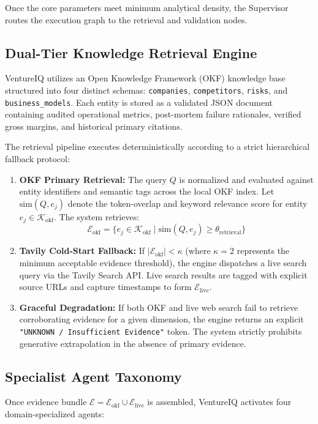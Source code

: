 \documentclass[conference]{IEEEtran}
\begin{document}
Once the core parameters meet minimum analytical density, the Supervisor routes the execution graph to the retrieval and validation nodes.

\subsection{Dual-Tier Knowledge Retrieval Engine}
VentureIQ utilizes an Open Knowledge Framework (OKF) knowledge base structured into four distinct schemas: \texttt{companies}, \texttt{competitors}, \texttt{risks}, and \texttt{business\_models}. Each entity is stored as a validated JSON document containing audited operational metrics, post-mortem failure rationales, verified gross margins, and historical primary citations.

The retrieval pipeline executes deterministically according to a strict hierarchical fallback protocol:
\begin{enumerate}
    \item \textbf{OKF Primary Retrieval:} The query $Q$ is normalized and evaluated against entity identifiers and semantic tags across the local OKF index. Let $\text{sim}(Q, e_j)$ denote the token-overlap and keyword relevance score for entity $e_j \in \mathcal{K}_{\text{okf}}$. The system retrieves:
    \begin{equation}
    \mathcal{E}_{\text{okf}} = \{e_j \in \mathcal{K}_{\text{okf}} \mid \text{sim}(Q, e_j) \ge \theta_{\text{retrieval}}\}
    \end{equation}
    \item \textbf{Tavily Cold-Start Fallback:} If $|\mathcal{E}_{\text{okf}}| < \kappa$ (where $\kappa = 2$ represents the minimum acceptable evidence threshold), the engine dispatches a live search query via the Tavily Search API. Live search results are tagged with explicit source URLs and capture timestamps to form $\mathcal{E}_{\text{live}}$.
    \item \textbf{Graceful Degradation:} If both OKF and live web search fail to retrieve corroborating evidence for a given dimension, the engine returns an explicit \texttt{"UNKNOWN / Insufficient Evidence"} token. The system strictly prohibits generative extrapolation in the absence of primary evidence.
\end{enumerate}

\subsection{Specialist Agent Taxonomy}
Once evidence bundle $\mathcal{E} = \mathcal{E}_{\text{okf}} \cup \mathcal{E}_{\text{live}}$ is assembled, VentureIQ activates four domain-specialized agents:
\end{document}
